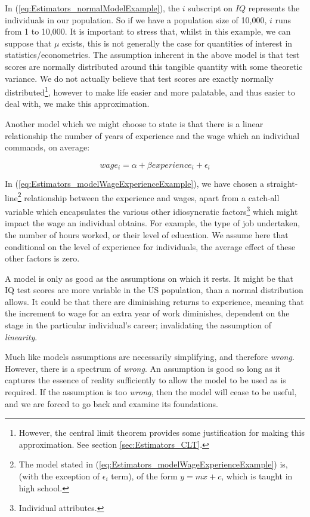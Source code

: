 \documentclass[11pt,fullpage]{book}
\begin{document}
In (\ref{eq:Estimators_normalModelExample}), the $i$ subscript on $IQ$ represents the individuals in our population. So if we have a population size of 10,000, $i$ runs from 1 to 10,000. It is important to stress that, whilst in this example, we can suppose that $\mu$ exists, this is not generally the case for quantities of interest in statistics/econometrics. The assumption inherent in the above model is that test scores are normally distributed around this tangible quantity with some theoretic variance. We do not actually believe that test scores are exactly normally distributed\footnote{However, the central limit theorem provides some justification for making this approximation. See section \ref{sec:Estimators_CLT}.}, however to make life easier and more palatable, and thus easier to deal with, we make this approximation. 

Another model which we might choose to state is that there is a linear relationship the number of years of experience and the wage which an individual commands, on average:

\begin{equation}\label{eq:Estimators_modelWageExperienceExample}
wage_i = \alpha + \beta experience_i + \epsilon_i
\end{equation}

In (\ref{eq:Estimators_modelWageExperienceExample}), we have chosen a straight-line\footnote{The model stated in (\ref{eq:Estimators_modelWageExperienceExample}) is, (with the exception of $\epsilon_i$ term), of the form $y = mx + c$, which is taught in high school.} relationship between the experience and wages, apart from a catch-all variable which encapsulates the various other idiosyncratic factors\footnote{Individual attributes.} which might impact the wage an individual obtains. For example, the type of job undertaken, the number of hours worked, or their level of education. We assume here that conditional on the level of experience for individuals, the average effect of these other factors is zero.

A model is only as good as the assumptions on which it rests. It might be that IQ test scores are more variable in the US population, than a normal distribution allows. It could be that there are diminishing returns to experience, meaning that the increment to wage for an extra year of work diminishes, dependent on the stage in the particular individual's career; invalidating the assumption of \textit{linearity}.

Much like models assumptions are necessarily simplifying, and therefore \textit{wrong}. However, there is a spectrum of \textit{wrong}. An assumption is good so long as it captures the essence of reality sufficiently to allow the model to be used as is required. If the assumption is too \textit{wrong}, then the model will cease to be useful, and we are forced to go back and examine its foundations.
\end{document}
